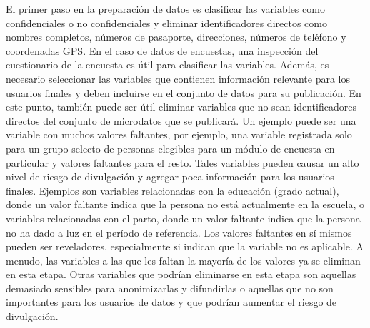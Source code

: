 \documentclass[]{book}
\theoremstyle{definition}
\theoremstyle{definition}
\theoremstyle{definition}
\theoremstyle{definition}
\theoremstyle{remark}
\begin{document}
El primer paso en la preparación de datos es clasificar las variables como confidenciales o no confidenciales y eliminar identificadores directos como nombres completos, números de pasaporte, direcciones, números de teléfono y coordenadas GPS. En el caso de datos de encuestas, una inspección del cuestionario de la encuesta es útil para clasificar las variables. Además, es necesario seleccionar las variables que contienen información relevante para los usuarios finales y deben incluirse en el conjunto de datos para su publicación. En este punto, también puede ser útil eliminar variables que no sean identificadores directos del conjunto de microdatos que se publicará. Un ejemplo puede ser una variable con muchos valores faltantes, por ejemplo, una variable registrada solo para un grupo selecto de personas elegibles para un módulo de encuesta en particular y valores faltantes para el resto. Tales variables pueden causar un alto nivel de riesgo de divulgación y agregar poca información para los usuarios finales. Ejemplos son variables relacionadas con la educación (grado actual), donde un valor faltante indica que la persona no está actualmente en la escuela, o variables relacionadas con el parto, donde un valor faltante indica que la persona no ha dado a luz en el período de referencia. Los valores faltantes en sí mismos pueden ser reveladores, especialmente si indican que la variable no es aplicable. A menudo, las variables a las que les faltan la mayoría de los valores ya se eliminan en esta etapa. Otras variables que podrían eliminarse en esta etapa son aquellas demasiado sensibles para anonimizarlas y difundirlas o aquellas que no son importantes para los usuarios de datos y que podrían aumentar el riesgo de divulgación.
\end{document}
